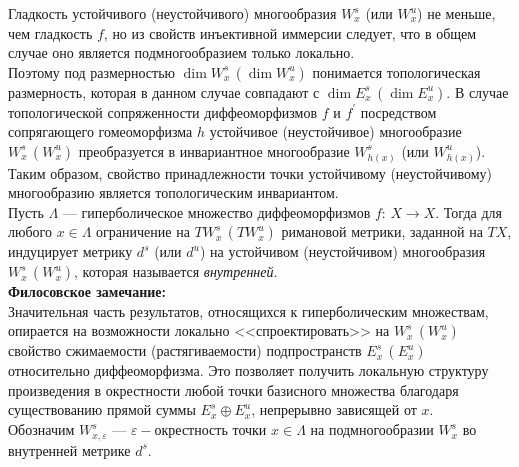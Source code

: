 \noindent Гладкость устойчивого (неустойчивого) многообразия \(W_x^s\) (или \(W_x^u\)) не меньше, 
чем гладкость \(f\), но из свойств инъективной иммерсии следует, что в общем случае оно является подмногообразием только локально. 
\\[2mm]
Поэтому под размерностью \(\dim W_x^s\, (\dim W_x^u)\) понимается топологическая размерность, которая в данном случае совпадают с 
\(\dim E_x^s\, (\dim E_x^u)\). В случае топологической сопряженности диффеоморфизмов \(f\) и \(f^{\prime}\) посредством 
сопрягающего гомеоморфизма \(h\) устойчивое (неустойчивое) многообразие \(W_x^s\, (W_x^u)\) преобразуется 
в инвариантное многообразие \(W_{h(x)}^s\) (или \(W_{h(x)}^u\)). Таким образом, свойство принадлежности 
точки устойчивому (неустойчивому) многообразию является топологическим инвариантом. 
\\[2mm]
Пусть \(\Lambda\) --- гиперболическое множество диффеоморфизмов \(f{:}\, X \to X\). Тогда для любого \(x \in \Lambda\) ограничение на \(TW_x^s\, (TW_x^u)\)
римановой метрики, заданной на \(TX\), индуцирует метрику \(d^s\) (или \(d^u\)) на устойчивом (неустойчивом) многообразия
\(W_x^s\, (W_x^u)\), которая называется \textit{внутренней}. 
\\[2mm]
\textbf{Филосовское замечание:}\\
Значительная часть результатов, относящихся к гиперболическим множествам, опирается на 
возможности локально <<спроектировать>> на \(W_x^s\, (W_x^u)\) свойство сжимаемости (растягиваемости)
подпространств \(E_x^s\, (E_x^u)\) относительно диффеоморфизма. Это позволяет получить локальную структуру
произведения в окрестности любой точки базисного множества благодаря существованию прямой суммы 
\(E_x^s \oplus E_x^u\), непрерывно зависящей от \(x\). 
\\[2mm]
Обозначим \(W_{x, \varepsilon}^s\) --- \(\varepsilon - \text{окрестность}\) точки \(x \in \Lambda\) на подмногообразии
\(W_x^s\) во внутренней метрике \(d^s\). 

